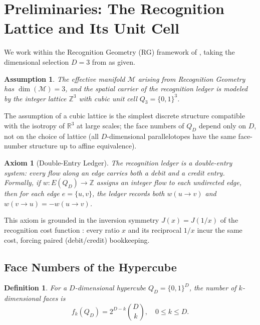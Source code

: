 \documentclass[11pt]{article}
\newtheorem{definition}[theorem]{Definition}
\newtheorem{axiom}[theorem]{Axiom}
\newtheorem{assumption}[theorem]{Assumption}
\newcommand{\M}{\mathcal{M}}
\newcommand{\Z}{\mathbb{Z}}
\newcommand{\R}{\mathbb{R}}
\newcommand{\dimop}{\dim}
\begin{document}
\section{Preliminaries: The Recognition Lattice and Its Unit Cell}
\label{sec:Q3}

We work within the Recognition Geometry (RG) framework of \cite{WashburnZlatanovicAllahyarov2026}, taking the dimensional selection $D = 3$ from \cite{PardoGuerraThapa2026} as given.

\begin{assumption}\label{ass:framework}
The effective manifold $\M$ arising from Recognition Geometry has $\dimop(\M) = 3$, and the spatial carrier of the recognition ledger is modeled by the integer lattice $\Z^3$ with cubic unit cell $Q_3 = \{0,1\}^3$.
\end{assumption}

The assumption of a cubic lattice is the simplest discrete structure compatible with the isotropy of $\R^3$ at large scales; the face numbers of $Q_D$ depend only on $D$, not on the choice of lattice (all $D$-dimensional parallelotopes have the same face-number structure up to affine equivalence).

\begin{axiom}[Double-Entry Ledger]\label{ax:double_entry}
The recognition ledger is a double-entry system: every flow along an edge carries both a debit and a credit entry.
Formally, if $w : E(Q_D) \to \Z$ assigns an integer flow to each undirected edge, then for each edge $e = \{u,v\}$, the ledger records both $w(u \to v)$ and $w(v \to u) = -w(u \to v)$.
\end{axiom}

This axiom is grounded in the inversion symmetry $J(x) = J(1/x)$ of the recognition cost function \cite{WashburnRahnamaiBarghi2026}: every ratio $x$ and its reciprocal $1/x$ incur the same cost, forcing paired (debit/credit) bookkeeping.

\subsection{Face Numbers of the Hypercube}

\begin{definition}\label{def:face_numbers}
For a $D$-dimensional hypercube $Q_D = \{0,1\}^D$, the number of $k$-dimensional faces is
\[
f_k(Q_D) = 2^{D-k} \binom{D}{k}, \quad 0 \le k \le D.
\]
\end{definition}
\end{document}
